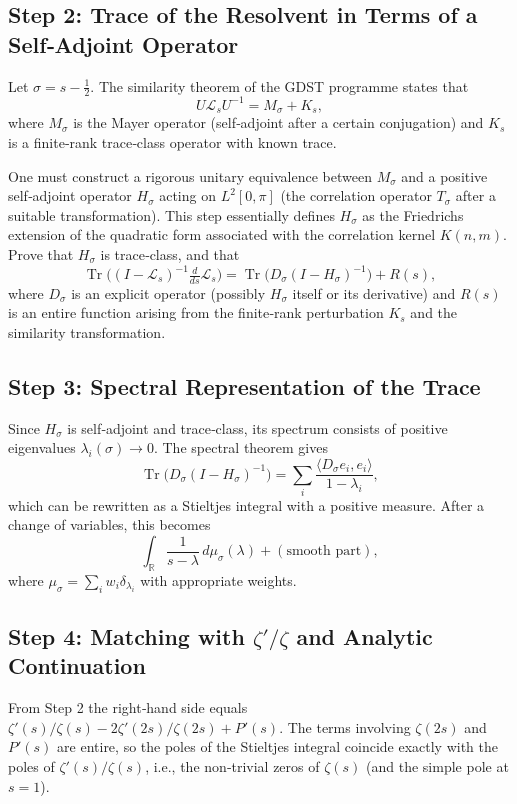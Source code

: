 \documentclass[11pt,a4paper]{article}
\newcommand{\R}{\mathbb{R}}
\newcommand{\LOp}{\mathcal{L}}
\newcommand{\Tr}{\operatorname{Tr}}
\begin{document}
\subsection{Step 2: Trace of the Resolvent in Terms of a Self‑Adjoint Operator}
Let \(\sigma = s - \frac12\). The similarity theorem of the GDST programme states that
\[
U \LOp_s U^{-1} = M_\sigma + K_s,
\]
where \(M_\sigma\) is the Mayer operator (self‑adjoint after a certain conjugation) and \(K_s\) is a finite‑rank trace‑class operator with known trace.

One must construct a rigorous unitary equivalence between \(M_\sigma\) and a positive self‑adjoint operator \(H_\sigma\) acting on \(L^2[0,\pi]\) (the correlation operator \(T_\sigma\) after a suitable transformation). This step essentially defines \(H_\sigma\) as the Friedrichs extension of the quadratic form associated with the correlation kernel \(K(n,m)\). Prove that \(H_\sigma\) is trace‑class, and that
\[
\Tr\bigl( (I - \LOp_s)^{-1} \tfrac{d}{ds}\LOp_s \bigr)
= \Tr\bigl( D_\sigma (I - H_\sigma)^{-1} \bigr) + R(s),
\]
where \(D_\sigma\) is an explicit operator (possibly \(H_\sigma\) itself or its derivative) and \(R(s)\) is an entire function arising from the finite‑rank perturbation \(K_s\) and the similarity transformation.

\subsection{Step 3: Spectral Representation of the Trace}
Since \(H_\sigma\) is self‑adjoint and trace‑class, its spectrum consists of positive eigenvalues \(\lambda_i(\sigma) \to 0\). The spectral theorem gives
\[
\Tr\bigl( D_\sigma (I - H_\sigma)^{-1} \bigr) = \sum_i \frac{\langle D_\sigma e_i, e_i\rangle}{1 - \lambda_i},
\]
which can be rewritten as a Stieltjes integral with a positive measure. After a change of variables, this becomes
\[
\int_{\R} \frac{1}{s - \lambda}\, d\mu_\sigma(\lambda) + (\text{smooth part}),
\]
where \(\mu_\sigma = \sum_i w_i \delta_{\lambda_i}\) with appropriate weights.

\subsection{Step 4: Matching with \(\zeta'/\zeta\) and Analytic Continuation}
From Step 2 the right‑hand side equals \(\zeta'(s)/\zeta(s) - 2\zeta'(2s)/\zeta(2s) + P'(s)\). The terms involving \(\zeta(2s)\) and \(P'(s)\) are entire, so the poles of the Stieltjes integral coincide exactly with the poles of \(\zeta'(s)/\zeta(s)\), i.e., the non‑trivial zeros of \(\zeta(s)\) (and the simple pole at \(s=1\)).
\end{document}

